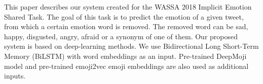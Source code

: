 This paper describes our system created for the WASSA 2018 Implicit Emotion Shared Task. The goal of this task is to predict the emotion of a given tweet, from which a certain emotion word is removed. The removed word can be sad, happy, disgusted, angry, afraid or a synonym of one of them. Our proposed system is based on deep-learning methods. We use Bidirectional Long Short-Term Memory (BiLSTM) with word embeddings as an input. Pre-trained DeepMoji model and pre-trained emoji2vec emoji embeddings are also used as additional inputs.
